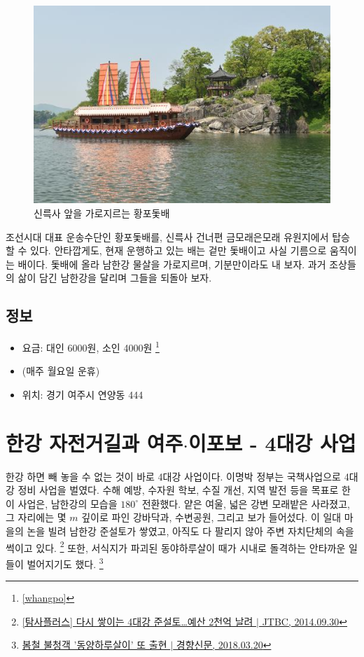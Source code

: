 \documentclass[chapter, oneside]{oblivoir}
\begin{document}
\begin{figure}
    \centering
    \includegraphics[width=.8\textwidth]{img/황포돛배.jpg}
    \caption{신륵사 앞을 가로지르는 황포돛배\protect\footnotemark}
    \label{fig:my_labe6}
\end{figure}


조선시대 대표 운송수단인 황포돛배를, 신륵사 건너편 금모래은모래 유원지에서 탑승할 수 있다. 
안타깝게도, 현재 운행하고 있는 배는 겉만 돛배이고 사실 기름으로 움직이는 배이다.
돛배에 올라 남한강 물살을 가로지르며, 기분만이라도 내 보자.
과거 조상들의 삶이 담긴 남한강을 달리며 그들을 되돌아 보자.

\subsection{정보}
\begin{itemize}
    \item 요금: 대인 6000원, 소인 4000원 \footnote{\ref{whangpo}}
    \item (매주 월요일 운휴)
    \item 위치: 경기 여주시 연양동 444
\end{itemize}

\section{한강 자전거길과 여주$\cdot$이포보 - 4대강 사업}

한강 하면 빼 놓을 수 없는 것이 바로 4대강 사업이다.
이명박 정부는 국책사업으로 4대강 정비 사업을 벌였다.
수해 예방, 수자원 학보, 수질 개선, 지역 발전 등을 목표로 한 이 사업은,
남한강의 모습을 $180^\circ$ 전환했다.
얕은 여울, 넓은 강변 모래밭은 사라졌고, 그 자리에는 몇 $m$ 깊이로 파인 강바닥과, 수변공원, 그리고 보가 들어섰다.
이 일대 마을의 논을 빌려 남한강 준설토가 쌓였고,
아직도 다 팔리지 않아 주변 자치단체의 속을 썩이고 있다.
\footnote{\href{https://news.jtbc.joins.com/article/article.aspx?news_id=NB10593178}{[탐사플러스] 다시 쌓이는 4대강 준설토…예산 2천억 날려 $|$ JTBC, 2014.09.30}}
또한, 서식지가 파괴된 동야하루살이 때가 시내로 돌격하는 안타까운 일들이 벌어지기도 했다.
\footnote{\href{http://news.khan.co.kr/kh_news/khan_art_view.html?artid=201803201448001&code=620109}{봄철 불청객 '동양하루살이' 또 출현 $|$ 경향신문, 2018.03.20}}
\end{document}

